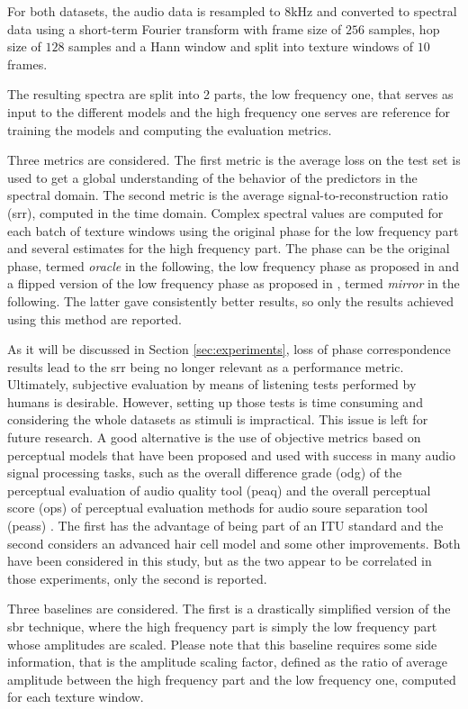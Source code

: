 \documentclass{article}
\begin{document}
For both datasets, the audio data is resampled to $8$kHz and converted to spectral data using a short-term Fourier transform with frame size of $256$ samples, hop size of $128$ samples and a Hann window and split into texture windows of $10$ frames.

The resulting spectra are split into 2 parts, the low frequency one, that serves as input to the different models and the high frequency one serves are reference for training the models and computing the evaluation metrics.

Three metrics are considered. The first metric is the average loss on the test set is used to get a global understanding of the behavior of the predictors in the spectral domain. The second metric is the average signal-to-reconstruction ratio (srr), computed in the time domain. Complex spectral values are computed for each batch of texture windows using the original phase for the low frequency part and several estimates for the high frequency part. The phase can be the original phase, termed \textit{oracle} in the following, the low frequency phase as proposed in \cite{miron2018high} and a flipped version of the low frequency phase as proposed in \cite{li2015deep}, termed \textit{mirror} in the following. The latter gave consistently better results, so only the results achieved using this method are reported.

As it will be discussed in Section \ref{sec:experiments}, loss of phase correspondence results lead to the srr being no longer relevant as a performance metric. Ultimately, subjective evaluation by means of listening tests performed by humans is desirable. However, setting up those tests is time consuming and considering the whole datasets as stimuli is impractical. This issue is left for future research. A good alternative is the use of objective metrics based on perceptual models that have been proposed and used with success in many audio signal processing tasks, such as the overall difference grade (odg) of the perceptual evaluation of audio quality tool (peaq) \cite{thiede2000peaq} and the overall perceptual score (ops) of perceptual evaluation methods for audio soure separation tool  (peass) \cite{emiya2011subjective}. The first has the advantage of being part of an ITU standard and the second considers an advanced hair cell model and some other improvements. Both have been considered in this study, but as the two appear to be correlated in those experiments, only the second is reported.

Three baselines are considered. The first is a drastically simplified version of the sbr technique, where the high frequency part is simply the low frequency part whose amplitudes are scaled. Please note that this baseline requires some side information, that is the amplitude scaling factor, defined as the ratio of average amplitude between the high frequency part and the low frequency one, computed for each texture window.
\end{document}
